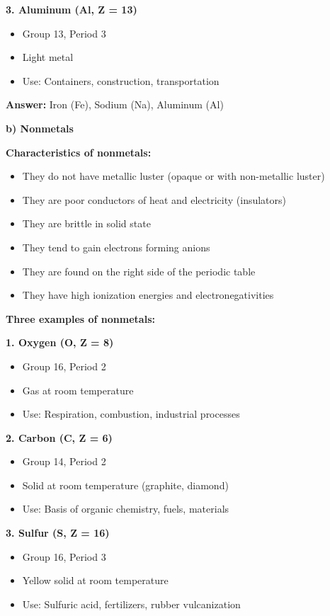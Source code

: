 \begin{exercise}
\begin{solu}
        \textbf{3. Aluminum (Al, Z = 13)}
        \begin{itemize}
            \item Group 13, Period 3
            \item Light metal
            \item Use: Containers, construction, transportation
        \end{itemize}

        \textbf{Answer:} Iron (Fe), Sodium (Na), Aluminum (Al)

        \textbf{b) Nonmetals}

        \textbf{Characteristics of nonmetals:}
        \begin{itemize}
            \item They do not have metallic luster (opaque or with non-metallic luster)
            \item They are poor conductors of heat and electricity (insulators)
            \item They are brittle in solid state
            \item They tend to gain electrons forming anions
            \item They are found on the right side of the periodic table
            \item They have high ionization energies and electronegativities
        \end{itemize}

        \textbf{Three examples of nonmetals:}

        \textbf{1. Oxygen (O, Z = 8)}
        \begin{itemize}
            \item Group 16, Period 2
            \item Gas at room temperature
            \item Use: Respiration, combustion, industrial processes
        \end{itemize}

        \textbf{2. Carbon (C, Z = 6)}
        \begin{itemize}
            \item Group 14, Period 2
            \item Solid at room temperature (graphite, diamond)
            \item Use: Basis of organic chemistry, fuels, materials
        \end{itemize}

        \textbf{3. Sulfur (S, Z = 16)}
        \begin{itemize}
            \item Group 16, Period 3
            \item Yellow solid at room temperature
            \item Use: Sulfuric acid, fertilizers, rubber vulcanization
        \end{itemize}


\end{solu}
\end{exercise}
